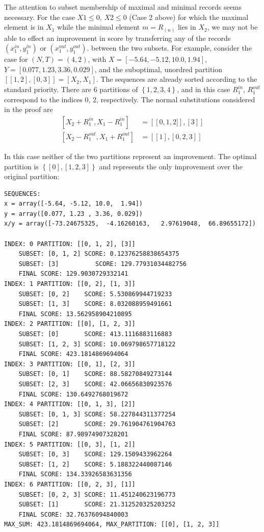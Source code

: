\documentclass{article}
\theoremstyle{case}
\begin{document}
\vspace{16pt}

The attention to subset membership of maximal and minimal records seems necessary. For the case $X1 \leq 0$, $X2 \leq 0$ (Case 2 above) for which the maximal element is in $X_1$ while the minimal element $m = R_{(n)}$ lies in $X_2$, we may not be able to effect an improvement in score by transferring any of the records $\left( x_1^{in}, y_1^{in}\right)$ or $\left( x_1^{out}, y_1^{out}\right)$. between the two subsets. For example, consider the case for $\left( N, T\right) = \left( 4, 2\right)$, with $X = [-5.64, -5.12, 10.0,  1.94]$, $Y = [0.077, 1.23 , 3.36, 0.029]$, and the suboptimal, unordred partition $\left[ \left[ 1, 2\right], \left[ 0, 3\right] \right] = \left[ X_2, X_1\right]$. The sequences are already sorted according to the standard priority. There are 6 partitions of $\left\lbrace 1, 2, 3, 4\right\rbrace$, and in this case $R_1^{in}$, $R_1^{out}$ correspond to the indices 0, 2, respectively. The normal substitutions considered in the proof are
\begin{align*}
\left[ X_2 + R_1^{in}, X_1 - R_1^{in}\right] & = \left[ \left[0,1,2] \right], \left[ 3\right] \right] \\
\left[ X_2 - R_1^{out}, X_1 + R_1^{out}\right] & = \left[ \left[ 1 \right], \left[ 0, 2, 3 \right] \right]
\end{align*}

In this case neither of the two partitions represent an improvement. The optimal partition is $\left\lbrace \left[ 0 \right], \left[ 1, 2, 3\right]\right\rbrace$ and represents the only improvement over the original partition:

\begin{verbatim}
SEQUENCES:
x = array([-5.64, -5.12, 10.0,  1.94])
y = array([0.077, 1.23 , 3.36, 0.029])
x/y = array([-73.24675325,  -4.16260163,   2.97619048,  66.89655172])

INDEX: 0 PARTITION: [[0, 1, 2], [3]]
    SUBSET: [0, 1, 2] SCORE: 0.12376258838654375
    SUBSET: [3] 		 SCORE: 129.77931034482756
    FINAL SCORE: 129.9030729332141
INDEX: 1 PARTITION: [[0, 2], [1, 3]]
    SUBSET: [0, 2]    SCORE: 5.530869944719233
    SUBSET: [1, 3]    SCORE: 8.032088959491661
    FINAL SCORE: 13.562958904210895
INDEX: 2 PARTITION: [[0], [1, 2, 3]]
	SUBSET: [0]       SCORE: 413.1116883116883
    SUBSET: [1, 2, 3] SCORE: 10.069798657718122
    FINAL SCORE: 423.1814869694064
INDEX: 3 PARTITION: [[0, 1], [2, 3]]
    SUBSET: [0, 1]    SCORE: 88.58270849273144
    SUBSET: [2, 3]    SCORE: 42.06656830923576
    FINAL SCORE: 130.6492768019672
INDEX: 4 PARTITION: [[0, 1, 3], [2]]
    SUBSET: [0, 1, 3] SCORE: 58.227844311377254
    SUBSET: [2]       SCORE: 29.761904761904763
    FINAL SCORE: 87.98974907328201
INDEX: 5 PARTITION: [[0, 3], [1, 2]]
    SUBSET: [0, 3]    SCORE: 129.1509433962264
    SUBSET: [1, 2]    SCORE: 5.188322440087146
    FINAL SCORE: 134.33926583631356
INDEX: 6 PARTITION: [[0, 2, 3], [1]]
    SUBSET: [0, 2, 3] SCORE: 11.451240623196773
    SUBSET: [1]       SCORE: 21.312520325203252
    FINAL SCORE: 32.76376094840003
MAX_SUM: 423.1814869694064, MAX_PARTITION: [[0], [1, 2, 3]]

\end{verbatim}
\end{document}

